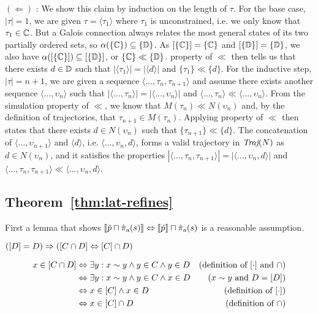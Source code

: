 $(\Leftarrow)$ : We show this claim by induction on the length of $\tau$. For the base case, $| \tau | = 1$, we are given $\tau = \langle \tau_{1} \rangle$ where $\tau_{1}$ is unconstrained, i.e. we only know that $\tau_{1} \in \mathbb{C}$. But a Galois connection always relates the most general states of its two partially ordered sets, so $\alpha(\{ \mathbb{C} \}) \subseteq \{ \mathbb{D} \}$. As $[\{ \mathbb{C} \}] = \{ \mathbb{C} \}$ and $[\{ \mathbb{D} \}] = \{ \mathbb{D} \}$, we also have $\alpha([\{ \mathbb{C} \}]) \subseteq [\{ \mathbb{D} \}]$, or $\{ \mathbb{C} \} \ll \{ \mathbb{D} \}$.  property of $\ll$ then tells us that there exists $d \in \mathbb{D}$ such that $|\langle \tau_{1} \rangle| = |\langle d \rangle|$ and $\{ \tau_{1} \} \ll \{ d \}$. For the inductive step, $| \tau | = n + 1$, we are given a sequence $\langle \dots, \tau_{n}, \tau_{n+1} \rangle$ and assume there exists another sequence $\langle \dots, \upsilon_{n} \rangle$ such that $|\langle \dots, \tau_{n} \rangle| = |\langle \dots, \upsilon_{n} \rangle|$ and $\langle \dots, \tau_{n} \rangle \ll \langle \dots, \upsilon_{n} \rangle$. From the simulation property of $\ll$, we know that $M(\tau_{n}) \ll N(\upsilon_{n})$ and, by the definition of trajectories, that $\tau_{n+1} \in M(\tau_{n})$. Applying  property of $\ll$ then states that there exists $d \in N(\upsilon_{n})$ such that $\{ \tau_{n+1} \} \ll \{ d \}$. The concatenation of $\langle \dots, \upsilon_{n+1} \rangle$ and $\langle d \rangle$, i.e. $\langle \dots, \upsilon_{n}, d \rangle$, forms a valid trajectory in $\operatorname{\textit{Traj}}(N)$ as $d \in N(\upsilon_{n})$, and it satisfies the properties $| \langle \dots, \tau_{n}, \tau_{n+1} \rangle | = | \langle \dots, \upsilon_{n}, d \rangle |$ and $\langle \dots, \tau_{n}, \tau_{n+1} \rangle \ll \langle \dots, \upsilon_{n}, d \rangle$. %


\subsection{Theorem~\ref{thm:lat-refines}}

First a lemma that shows $\llbracket \hat p \sqcap \operatorname{\hat{\pi}_{\textrm{a}}}(s) \rrbracket \Leftrightarrow \llbracket \hat p \rrbracket \sqcap \operatorname{\hat{\pi}_{\textrm{a}}}(s)$ is a reasonable assumption.

\begin{lemma}
$([D] = D) \Rightarrow ([C \cap D] \Leftrightarrow [C] \cap D)$
\end{lemma}
%
\begin{align*}
x \in [C \cap D] & \Leftrightarrow \exists y : x \sim y \wedge y \in C \wedge y \in D & (\textrm{definition of } [\cdot] \textrm{ and } \cap) \\
                     & \Leftrightarrow \exists y : x \sim y \wedge y \in C \wedge x \in D & (x \sim y \textrm{ and } D = [D]) \\
                     & \Leftrightarrow x \in [C] \wedge x \in D                       & (\textrm{definition of } [\cdot]) \\
                     & \Leftrightarrow x \in [C] \cap D                               & (\textrm{definition of } \cap)
\end{align*}


